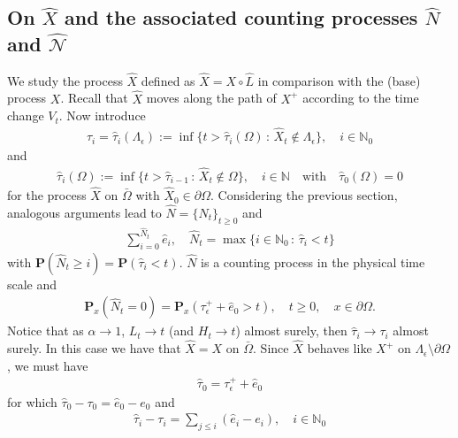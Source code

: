 \documentclass[11pt,a4paper]{article}
\begin{document}
\subsection{On $\hat{X}$ and the associated counting processes $\hat{N}$ and $\hat{\mathcal{N}}$}
\label{SecSubXhat}
We study the process $\hat{X}$ defined as $\hat{X} = X \circ \hat{L}$ in comparison with the (base) process $X$. Recall that $\hat{X}$ moves along the path of $X^+$ according to the time change $V_t$.  Now introduce
\begin{align*}
\hat{\tau}_i=\hat{\tau}_i(\Lambda_\epsilon) := \inf\{t > \hat{\tau}_i(\Omega)\, :\, \hat{X}_t \notin  \Lambda_\epsilon \}, \quad i \in \mathbb{N}_0
\end{align*} 
and
\begin{align*}
\hat{\tau}_i(\Omega) := \inf\{t > \hat{\tau}_{i-1}\, :\, \hat{X}_t \notin  \Omega \}, \quad i \in \mathbb{N} \quad \textrm{with} \quad \hat{\tau}_0(\Omega)=0
\end{align*}
for the process $\hat{X}$ on $\bar{\Omega}$ with $\hat{X}_0 \in \partial \Omega$. Considering the previous section, analogous arguments lead to $\hat{N}=\{\hat{N}_t\}_{t \geq 0}$ and 
\begin{align}
\label{totalAmountLTXhat}
\sum_{i=0}^{\hat{N}_t} \hat{e}_i, \quad \hat{N}_t = \max \{ i \in \mathbb{N}_0\,:\, \hat{\tau}_i < t\} 
\end{align}
with $\mathbf{P}(\hat{N}_t \geq i) = \mathbf{P}(\hat{\tau}_i < t)$. $\hat{N}$ is a counting process in the physical time scale and
\begin{align*}
\mathbf{P}_x(\hat{N}_t = 0) = \mathbf{P}_x(\tau^+_\epsilon + \hat{e}_0 > t), \quad t \geq 0, \quad x \in \partial \Omega.
\end{align*}
Notice that as $\alpha\to 1$, $L_t \to t$ (and $H_t \to t$) almost surely, then $\hat{\tau}_i \to \tau_i$ almost surely. In this case we have that $\hat{X} = X$ on $\bar{\Omega}$. Since $\hat{X}$ behaves like $X^+$ on $\Lambda_\epsilon \setminus \partial \Omega$, we must have
\begin{align*}
\hat{\tau}_0 = \tau^+_\epsilon + \hat{e}_0
\end{align*}  
for which $\hat{\tau}_0 - \tau_0 = \hat{e}_0 - e_0$ and 
\begin{align*}
\hat{\tau}_i - \tau_i = \sum_{j \leq i} (\hat{e}_i - e_i), \quad i \in \mathbb{N}_0
\end{align*}
\end{document}
